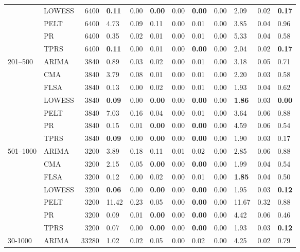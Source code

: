 \begin{table}[ht]
\begin{tabular}{llrlrlrlrlrl}
   & LOWESS & 6400 & \textbf{0.11} & 0.00 & \textbf{0.00} & 0.00 & \textbf{0.00} & 0.00 & 2.09 & 0.02 & \textbf{0.17} \\ 
   & PELT & 6400 & 4.73 & 0.09 & 0.11 & 0.00 & 0.01 & 0.00 & 3.85 & 0.04 & 0.96 \\ 
   & PR & 6400 & 0.35 & 0.02 & 0.01 & 0.00 & 0.01 & 0.00 & 5.33 & 0.04 & 0.58 \\ 
   & TPRS & 6400 & \textbf{0.11} & 0.00 & 0.01 & 0.00 & \textbf{0.00} & 0.00 & 2.04 & 0.02 & \textbf{0.17} \\ 
  201–500 & ARIMA & 3840 & 0.89 & 0.03 & 0.02 & 0.00 & 0.01 & 0.00 & 3.18 & 0.05 & 0.71 \\ 
   & CMA & 3840 & 3.79 & 0.08 & 0.01 & 0.00 & 0.01 & 0.00 & 2.20 & 0.03 & 0.58 \\ 
   & FLSA & 3840 & 0.13 & 0.00 & 0.02 & 0.00 & 0.01 & 0.00 & 1.93 & 0.04 & 0.62 \\ 
   & LOWESS & 3840 & \textbf{0.09} & 0.00 & \textbf{0.00} & 0.00 & \textbf{0.00} & 0.00 & \textbf{1.86} & 0.03 & \textbf{0.00} \\ 
   & PELT & 3840 & 7.03 & 0.16 & 0.04 & 0.00 & 0.01 & 0.00 & 3.64 & 0.06 & 0.88 \\ 
   & PR & 3840 & 0.15 & 0.01 & \textbf{0.00} & 0.00 & \textbf{0.00} & 0.00 & 4.59 & 0.06 & 0.54 \\ 
   & TPRS & 3840 & \textbf{0.09} & 0.00 & \textbf{0.00} & 0.00 & \textbf{0.00} & 0.00 & 1.90 & 0.03 & 0.17 \\ 
  501–1000 & ARIMA & 3200 & 3.89 & 0.18 & 0.11 & 0.01 & 0.02 & 0.00 & 2.85 & 0.06 & 0.88 \\ 
   & CMA & 3200 & 2.15 & 0.05 & \textbf{0.00} & 0.00 & \textbf{0.00} & 0.00 & 1.99 & 0.04 & 0.54 \\ 
   & FLSA & 3200 & 0.12 & 0.00 & 0.02 & 0.00 & 0.01 & 0.00 & \textbf{1.85} & 0.04 & 0.50 \\ 
   & LOWESS & 3200 & \textbf{0.06} & 0.00 & \textbf{0.00} & 0.00 & \textbf{0.00} & 0.00 & 1.95 & 0.03 & \textbf{0.12} \\ 
   & PELT & 3200 & 11.42 & 0.23 & 0.05 & 0.00 & \textbf{0.00} & 0.00 & 11.67 & 0.32 & 0.88 \\ 
   & PR & 3200 & 0.09 & 0.01 & \textbf{0.00} & 0.00 & \textbf{0.00} & 0.00 & 4.42 & 0.06 & 0.46 \\ 
   & TPRS & 3200 & 0.07 & 0.00 & \textbf{0.00} & 0.00 & \textbf{0.00} & 0.00 & 1.93 & 0.03 & \textbf{0.12} \\ 
  30-1000 & ARIMA & 33280 & 1.02 & 0.02 & 0.05 & 0.00 & 0.02 & 0.00 & 4.25 & 0.02 & 0.79 \\ 

\end{tabular}
\end{table}
